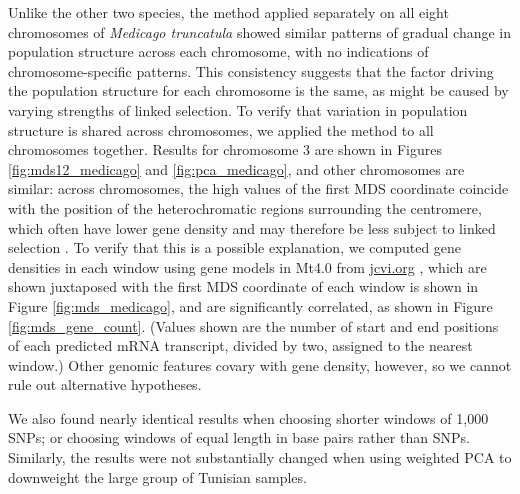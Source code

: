 \documentclass[11pt, oneside]{article}   	%
\begin{document}
Unlike the other two species,
the method applied separately on all eight chromosomes of \textit{Medicago truncatula} 
showed similar patterns of gradual change in population structure across each chromosome,
with no indications of chromosome-specific patterns.
This consistency suggests that the factor driving the population structure for each chromosome is the same,
as might be caused by varying strengths of linked selection.
To verify that variation in population structure is shared across chromosomes,
we applied the method to all chromosomes together.
Results for chromosome 3 are shown in Figures \ref{fig:mds12_medicago} and \ref{fig:pca_medicago},
and other chromosomes are similar:
across chromosomes, the high values of the first MDS coordinate coincide with the position of the heterochromatic regions surrounding the centromere,
which often have lower gene density and may therefore be less subject to linked selection \citep{kulikova2001integration,paape2013selection}. 
To verify that this is a possible explanation,
we computed gene densities in each window using gene models in Mt4.0 from \url{jcvi.org} \citep{tang2014improved},
which are shown juxtaposed with
the first MDS coordinate of each window is shown in Figure \ref{fig:mds_medicago},
and are significantly correlated, as shown in Figure \ref{fig:mds_gene_count}.
(Values shown are the number of start and end positions of each predicted mRNA transcript,
divided by two, assigned to the nearest window.)
Other genomic features covary with gene density, however,
so we cannot rule out alternative hypotheses.

We also found nearly identical results when choosing shorter windows of 1,000 SNPs;
or choosing windows of equal length in base pairs rather than SNPs.
Similarly, the results were not substantially changed
when using weighted PCA to downweight the large group of Tunisian samples.
\end{document}
